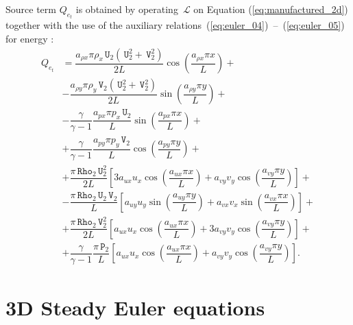 \documentclass[10pt]{article}
\newcommand{\Rho}{\,\mathtt{Rho}}
\newcommand{\PP}{\,\mathtt{P}}
\newcommand{\U}{\,\mathtt{U}}
\newcommand{\V}{\,\mathtt{V}}
\newcommand{\Lo}{\,\mathcal{L}}
\begin{document}
Source term $Q_{e_t}$ is obtained by operating $\Lo$ on Equation  (\ref{eq:manufactured_2d}) together with the use of the  auxiliary relations~(\ref{eq:euler_04})~--~(\ref{eq:euler_05}) for energy :
\begin{equation}
 \begin{split}\label{eq:source_e_2d}
Q_{e_t} &=\dfrac{ a_{\rho x} \pi \rho_x  \U_2 (\U_2^2+\V_2^2)}{2L}\cos\left(\dfrac{a_{\rho x} \pi x}{L}\right)+\\
&-\dfrac{ a_{\rho y} \pi \rho_y \V_2 (\U_2^2+\V_2^2) }{2L}\sin\left(\dfrac{a_{\rho y} \pi y}{L}\right) +\\
&-\dfrac{\gamma}{\gamma-1}\dfrac{a_{px} \pi p_x  \U_2}{L}\sin\left(\dfrac{a_{px} \pi x}{L}\right) +\\
&+  \dfrac{\gamma}{\gamma-1}\dfrac{a_{py}\pi p_y  \V_2}{L}\cos\left(\dfrac{a_{py} \pi y}{L}\right)+\\
&+ \dfrac{ \pi \Rho_2 \U_2^2}{2L}\left[3 a_{ux} u_x \cos\left(\dfrac{a_{ux} \pi x}{L}\right)+a_{vy} v_y \cos\left(\dfrac{a_{vy} \pi y}{L}\right)\right]+\\
&-\dfrac{\pi \Rho_2 \U_2 \V_2}{L}\left[a_{uy} u_y \sin\left(\dfrac{a_{uy} \pi y}{L}\right)+a_{vx}  v_x\sin\left(\dfrac{a_{vx} \pi x}{L}\right)\right] +\\
&+\dfrac{\pi \Rho_2 \V_2^2}{2L} \left[a_{ux} u_x \cos\left(\dfrac{a_{ux} \pi x}{L}\right)+3 a_{vy} v_y \cos\left(\dfrac{a_{vy} \pi y}{L}\right)\right] +\\
&+ \dfrac{\gamma}{\gamma-1}\dfrac{\pi \PP_2}{L}\left[a_{ux} u_x \cos\left(\dfrac{a_{ux} \pi x}{L}\right)+a_{vy} v_y \cos\left(\dfrac{a_{vy} \pi y}{L}\right)\right].
 \end{split}
\end{equation}



\section{3D Steady Euler equations}
\end{document}
